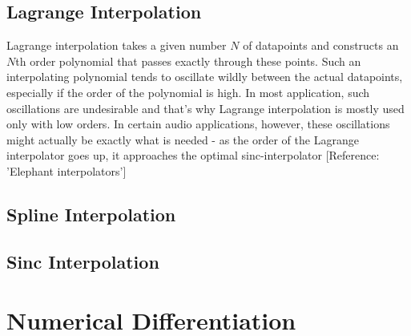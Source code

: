 \subsection{Lagrange Interpolation}
Lagrange interpolation takes a given number $N$ of datapoints and constructs an $N$th order polynomial that passes exactly through these points. Such an interpolating polynomial tends to oscillate wildly between the actual datapoints, especially if the order of the polynomial is high. In most application, such oscillations are undesirable and that's why Lagrange interpolation is mostly used only with low orders. In certain audio applications, however, these oscillations might actually be exactly what is needed - as the order of the Lagrange interpolator goes up, it approaches the optimal sinc-interpolator [Reference: 'Elephant interpolators']

\subsection{Spline Interpolation}


\subsection{Sinc Interpolation}



\section{Numerical Differentiation}


